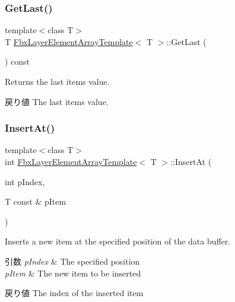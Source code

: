 \subsubsection{\texorpdfstring{Get\+Last()}{GetLast()}}
{\footnotesize\ttfamily template$<$class T$>$ \\
T \hyperlink{class_fbx_layer_element_array_template}{Fbx\+Layer\+Element\+Array\+Template}$<$ T $>$\+::Get\+Last (\begin{DoxyParamCaption}{ }\end{DoxyParamCaption}) const}

Returns the last item\textquotesingle{}s value. \begin{DoxyReturn}{戻り値}
The last item\textquotesingle{}s value. 
\end{DoxyReturn}
\mbox{\label{class_fbx_layer_element_array_template_adaf1260a3a9f1c68f9809ddaf051ac61}} 
\subsubsection{\texorpdfstring{Insert\+At()}{InsertAt()}}
{\footnotesize\ttfamily template$<$class T$>$ \\
int \hyperlink{class_fbx_layer_element_array_template}{Fbx\+Layer\+Element\+Array\+Template}$<$ T $>$\+::Insert\+At (\begin{DoxyParamCaption}\item[{int}]{p\+Index,  }\item[{T const \&}]{p\+Item }\end{DoxyParamCaption})}

Inserts a new item at the specified position of the data buffer. 
\begin{DoxyParams}{引数}
{\em p\+Index} & The specified position \\
\hline
{\em p\+Item} & The new item to be inserted \\
\hline
\end{DoxyParams}
\begin{DoxyReturn}{戻り値}
The index of the inserted item 
\end{DoxyReturn}
\mbox{\label{class_fbx_layer_element_array_template_ae914766602cbb45b38ce26765095f222}} 
